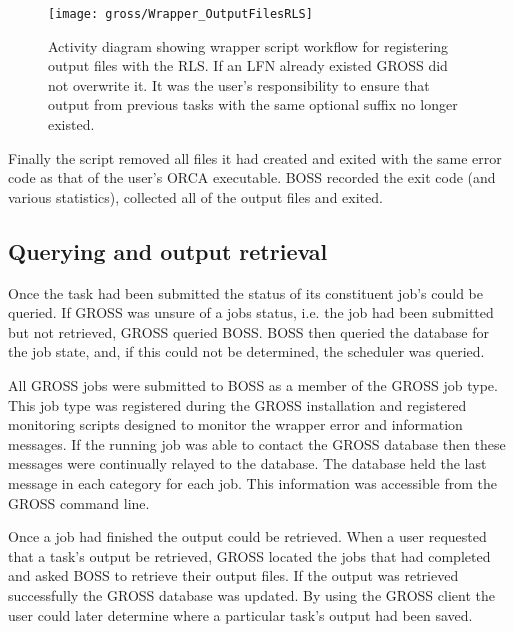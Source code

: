 \begin{figure}[!tbp]
  \centering
  \texttt{[image: gross/Wrapper\_OutputFilesRLS]}
  \caption{Activity diagram showing wrapper script workflow for registering output files with the RLS. If an LFN already existed GROSS did not overwrite it. It was the user's responsibility to ensure that output from previous tasks with the same optional suffix no longer existed.
  \label{fig:Wrapper_OutputFilesRLS}}
\end{figure}

Finally the script removed all files it had created and exited with the same error code as that of the user's ORCA executable. BOSS recorded the exit code (and various statistics), collected all of the output files and exited. 

\subsection{Querying and output retrieval}
Once the task had been submitted the status of its constituent job's could be queried. If GROSS was unsure of a jobs status, i.e. the job had been submitted but not retrieved, GROSS queried BOSS. BOSS then queried the database for the job state, and, if this could not be determined, the scheduler was queried. 

All GROSS jobs were submitted to BOSS as a member of the GROSS job type. This job type was registered during the GROSS installation and registered monitoring scripts designed to monitor the wrapper error and information messages. If the running job was able to contact the GROSS database then these messages were continually relayed to the database. The database held the last message in each category for each job. This information was accessible from the GROSS command line.

Once a job had finished the output could be retrieved. When a user requested that a task's output be retrieved, GROSS located the jobs that had completed and asked BOSS to retrieve their output files. If the output was retrieved successfully the GROSS database was updated. By using the GROSS client the user could later determine where a particular task's output had been saved.

